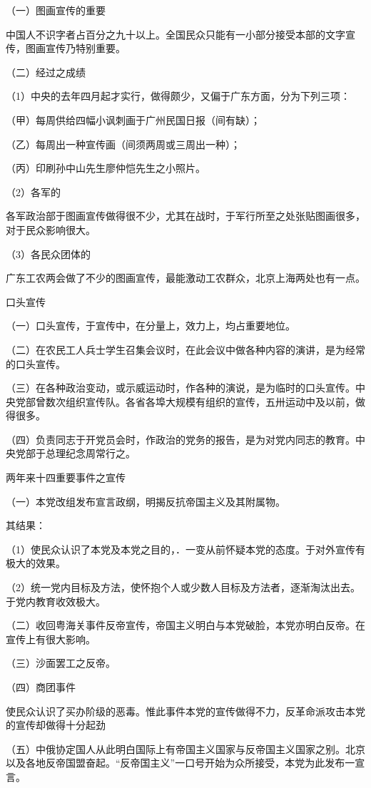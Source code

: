 （一）图画宣传的重要

中国人不识字者占百分之九十以上。全国民众只能有一小部分接受本部的文字宣传，图画宣传乃特别重要。

（二）经过之成绩

（1）中央的去年四月起才实行，做得颇少，又偏于广东方面，分为下列三项：

（甲）每周供给四幅小讽刺画于广州民国日报（间有缺）；

（乙）每周出一种宣传画（间须两周或三周出一种）；

（丙）印刷孙中山先生廖仲恺先生之小照片。

（2）各军的

各军政治部于图画宣传做得很不少，尤其在战时，于军行所至之处张贴图画很多，对于民众影响很大。

（3）各民众团体的

广东工农两会做了不少的图画宣传，最能激动工农群众，北京上海两处也有一点。

口头宣传

（一）口头宣传，于宣传中，在分量上，效力上，均占重要地位。

（二）在农民工人兵士学生召集会议时，在此会议中做各种内容的演讲，是为经常的口头宣传。

（三）在各种政治变动，或示威运动时，作各种的演说，是为临时的口头宣传。中央党部曾数次组织宣传队。各省各埠大规模有组织的宣传，五卅运动中及以前，做得很多。

（四）负责同志于开党员会时，作政治的党务的报告，是为对党内同志的教育。中央党部于总理纪念周常行之。

两年来十四重要事件之宣传

（一）本党改组发布宣言政纲，明揭反抗帝国主义及其附属物。

其结果：

（1）使民众认识了本党及本党之目的，．一变从前怀疑本党的态度。于对外宣传有极大的效果。

（2）统一党内目标及方法，使怀抱个人或少数人目标及方法者，逐渐淘汰出去。于党内教育收效极大。

（二）收回粤海关事件反帝宣传，帝国主义明白与本党破脸，本党亦明白反帝。在宣传上有很大影响。

（三）沙面罢工之反帝。

（四）商团事件

使民众认识了买办阶级的恶毒。惟此事件本党的宣传做得不力，反革命派攻击本党的宣传却做得十分起劲

（五）中俄协定国人从此明白国际上有帝国主义国家与反帝国主义国家之别。北京以及各地反帝国盟奋起。“反帝国主义”一口号开始为众所接受，本党为此发布一宣言。

